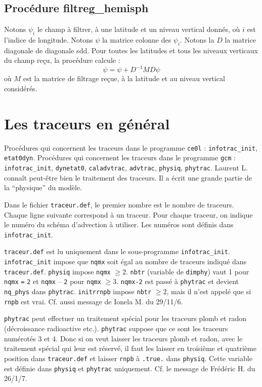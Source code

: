 \documentclass[a4paper,english,french]{article}
\begin{document}
\subsection{Procédure filtreg\_hemisph}

Notons $\psi_i$ le champ à filtrer, à une latitude et un niveau
vertical donnés, où $i$ est l'indice de longitude. Notons $\psi$ la
matrice colonne des $\psi_i$. Notons la $D$ la matrice diagonale de
diagonale sdd. Pour toutes les latitudes et tous les niveaux verticaux
du champ reçu, la procédure calcule :
\begin{equation*}
  \psi = \psi + D^{-1} M D  \psi
\end{equation*}
où $M$ est la matrice de filtrage reçue, à la latitude et au niveau
vertical considérés.

\section{Les traceurs en général}

Procédures qui concernent les traceurs dans le programme
\verb+ce0l+ : \verb+infotrac_init+, \verb+etat0dyn+. Procédures qui
concernent les traceurs dans le programme \verb+gcm+ :
\verb+infotrac_init+, \verb+dynetat0+, \verb+caladvtrac+, \verb+advtrac+,
\verb+physiq+, \verb+phytrac+. Laurent L. connaît peut-être bien le
traitement des traceurs. Il a écrit une grande partie de la
``physique'' du modèle.

Dans le fichier \verb+traceur.def+, le premier nombre est le nombre de
traceurs. Chaque ligne suivante correspond à un traceur. Pour chaque
traceur, on indique le numéro du schéma
d'advection à utiliser. Les numéros sont définis dans
\verb+infotrac_init+.

\verb+traceur.def+ est lu uniquement dans le sous-programme
\verb+infotrac_init+. \verb+infotrac_init+ impose que \verb+nqmx+ soit égal
au nombre de traceurs indiqué dans \verb+traceur.def+. \verb+physiq+
impose \verb+nqmx+ $\ge 2$. \verb+nbtr+ (variable de \verb+dimphy+)
vaut 1 pour \verb+nqmx+ \verb+=+ \verb+2+ et \verb+nqmx+ -- \verb+2+
pour \verb+nqmx+ $\ge 3$.  \verb+nqmx-2+ est passé à \verb+phytrac+ et
devient \verb+nq_phys+ dans \verb+phytrac+. \verb+initrrnpb+ impose
\verb+nbtr+ $\ge 2$, mais il n'est appelé que si \verb+rnpb+ est vrai.
Cf. aussi message de Ionela M. du 29/11/6.

\verb+phytrac+ peut effectuer un traitement spécial pour les traceurs
plomb et radon (décroissance radioactive etc.).  \verb+phytrac+
suppose que ce sont les traceurs numérotés 3 et 4. Donc si on veut
laisser les traceurs plomb et radon, avec le traitement spécial qui
leur est réservé, il faut les laisser en troisième et quatrième
position dans \verb+traceur.def+ et laisser \verb+rnpb+ à
\verb+.true.+ dans \verb+physiq+. Cette variable est définie dans
\verb+physiq+ et \verb+phytrac+ uniquement. Cf. le message de Frédéric
H. du 26/1/7.
\end{document}
